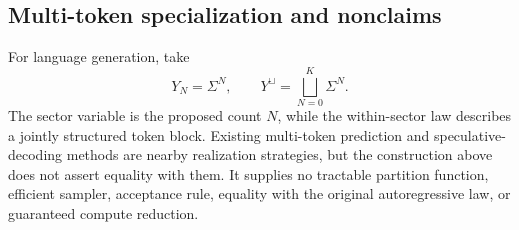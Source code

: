 \subsection{Multi-token specialization and nonclaims}

For language generation, take
\[
Y_N=\Sigma^N,
\qquad
Y^{\sqcup}=\bigsqcup_{N=0}^{K}\Sigma^N.
\]
The sector variable is the proposed count $N$, while the within-sector law describes a jointly structured token block. Existing multi-token prediction and speculative-decoding methods are nearby realization strategies, but the construction above does not assert equality with them. It supplies no tractable partition function, efficient sampler, acceptance rule, equality with the original autoregressive law, or guaranteed compute reduction.
